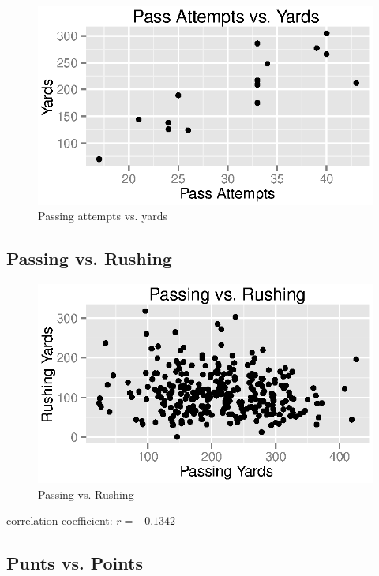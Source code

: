 \documentclass{exam}
\begin{document}
  \begin{figure}[H]
    \centering
    \includegraphics{figures/nfl/passing_attempts_vs_yds.eps}
    \caption{Passing attempts vs. yards}
  \end{figure}

  \subsection{Passing vs. Rushing}

  \begin{figure}[H]
    \centering
    \includegraphics{figures/nfl/passing_vs_rushing.eps}
    \caption{Passing vs. Rushing}
  \end{figure}

  correlation coefficient: $r = -0.1342$

  \subsection{Punts vs. Points}
\end{document}
